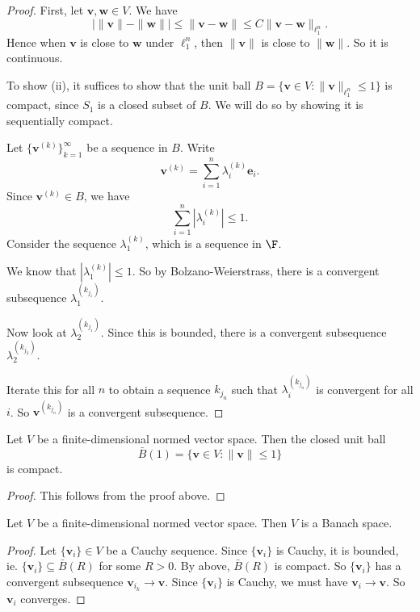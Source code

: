 \documentclass[a4paper]{article}
\begin{document}
\begin{proof}
  First, let $\mathbf{v}, \mathbf{w}\in V$. We have
  \[
    \big|\|\mathbf{v}\| - \|\mathbf{w}\|\big| \leq \|\mathbf{v} - \mathbf{w}\| \leq C\|\mathbf{v} - \mathbf{w}\|_{\ell_1^n}.
  \]
  Hence when $\mathbf{v}$ is close to $\mathbf{w}$ under $\ell_1^n$, then $\|\mathbf{v}\|$ is close to $\|\mathbf{w}\|$. So it is continuous.

  To show (ii), it suffices to show that the unit ball $B = \{\mathbf{v} \in V: \|\mathbf{v}\|_{\ell_1^n}\leq 1\}$ is compact, since $S_1$ is a closed subset of $B$. We will do so by showing it is sequentially compact.

  Let $\{\mathbf{v}^{(k)}\}_{k = 1}^\infty$ be a sequence in $B$. Write
  \[
    \mathbf{v}^{(k)} = \sum_{i = 1}^n \lambda_i^{(k)} \mathbf{e}_i.
  \]
  Since $\mathbf{v}^{(k)} \in B$, we have
  \[
    \sum_{i = 1}^n |\lambda_i^{(k)}| \leq 1.
  \]
  Consider the sequence $\lambda_1^{(k)}$, which is a sequence in $\F$.

  We know that $|\lambda_1^{(k)}| \leq 1$. So by Bolzano-Weierstrass, there is a convergent subsequence $\lambda_1^{(k_{j_1})}$.

  Now look at $\lambda_2^{(k_{j_1})}$. Since this is bounded, there is a convergent subsequence $\lambda_2^{(k_{j_2})}$.

  Iterate this for all $n$ to obtain a sequence $k_{j_n}$ such that $\lambda_i^{(k_{j_n})}$ is convergent for all $i$. So $\mathbf{v}^{(k_{j_n})}$ is a convergent subsequence.
\end{proof}

\begin{prop}
  Let $V$ be a finite-dimensional normed vector space. Then the closed unit ball
  \[
    \bar{B}(1) = \{\mathbf{v} \in V: \|\mathbf{v}\| \leq 1\}
  \]
  is compact.
\end{prop}

\begin{proof}
  This follows from the proof above.
\end{proof}

\begin{prop}
  Let $V$ be a finite-dimensional normed vector space. Then $V$ is a Banach space.
\end{prop}

\begin{proof}
  Let $\{\mathbf{v}_i\} \in V$ be a Cauchy sequence. Since $\{\mathbf{v}_i\}$ is Cauchy, it is bounded, ie. $\{\mathbf{v}_i\} \subseteq \bar{B}(R)$ for some $R > 0$. By above, $\bar{B}(R)$ is compact. So $\{\mathbf{v}_i\}$ has a convergent subsequence $\mathbf{v}_{i_k} \to \mathbf{v}$. Since $\{\mathbf{v}_i\}$ is Cauchy, we must have $\mathbf{v}_i \to \mathbf{v}$. So $\mathbf{v}_i$ converges.
\end{proof}
\end{document}
